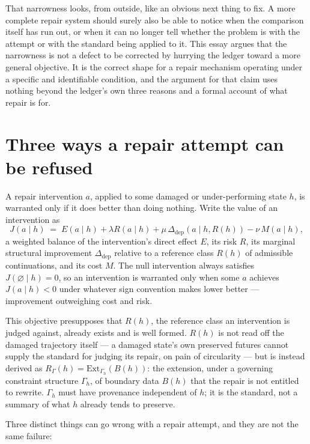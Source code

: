 \documentclass[11pt,openany]{book}
\begin{document}
That narrowness looks, from outside, like an obvious next thing to fix. A more complete repair system should surely also be able to notice when the comparison itself has run out, or when it can no longer tell whether the problem is with the attempt or with the standard being applied to it. This essay argues that the narrowness is not a defect to be corrected by hurrying the ledger toward a more general objective. It is the correct shape for a repair mechanism operating under a specific and identifiable condition, and the argument for that claim uses nothing beyond the ledger's own three reasons and a formal account of what repair is for.

\section{Three ways a repair attempt can be refused}

A repair intervention $a$, applied to some damaged or under-performing state $h$, is warranted only if it does better than doing nothing. Write the value of an intervention as
\[
J(a \mid h) \;=\; E(a \mid h) + \lambda R(a \mid h) + \mu\, \Delta_{\mathrm{dep}}(a \mid h, R(h)) - \nu\, M(a \mid h),
\]
a weighted balance of the intervention's direct effect $E$, its risk $R$, its marginal structural improvement $\Delta_{\mathrm{dep}}$ relative to a reference class $R(h)$ of admissible continuations, and its cost $M$. The null intervention always satisfies $J(\varnothing \mid h) = 0$, so an intervention is warranted only when some $a$ achieves $J(a\mid h) < 0$ under whatever sign convention makes lower better — improvement outweighing cost and risk.

This objective presupposes that $R(h)$, the reference class an intervention is judged against, already exists and is well formed. $R(h)$ is not read off the damaged trajectory itself — a damaged state's own preserved futures cannot supply the standard for judging its repair, on pain of circularity — but is instead derived as $R_\Gamma(h) = \mathrm{Ext}_{\Gamma_h}(B(h))$: the extension, under a governing constraint structure $\Gamma_h$, of boundary data $B(h)$ that the repair is not entitled to rewrite. $\Gamma_h$ must have provenance independent of $h$; it is the standard, not a summary of what $h$ already tends to preserve.

Three distinct things can go wrong with a repair attempt, and they are not the same failure:
\end{document}
